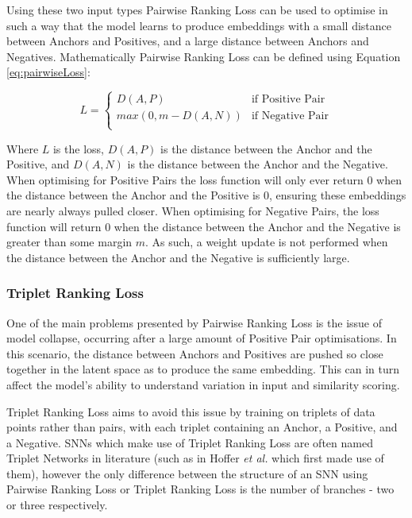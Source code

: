 Using these two input types Pairwise Ranking Loss can be used to optimise in such a way that the model learns to produce embeddings with a small distance between Anchors and Positives, and a large distance between Anchors and Negatives. Mathematically Pairwise Ranking Loss can be defined using Equation \ref{eq:pairwiseLoss}:

\begin{equation}
	\label{eq:pairwiseLoss}
	L =
		\begin{cases}
			D(A,P) & \text{if Positive Pair}\\
			max(0, m - D(A,N)) & \text{if Negative Pair}\\
		\end{cases}       
\end{equation}

Where $L$ is the loss, $D(A,P)$ is the distance between the Anchor and the Positive, and $D(A,N)$ is the distance between the Anchor and the Negative. When optimising for Positive Pairs the loss function will only ever return 0 when the distance between the Anchor and the Positive is 0, ensuring these embeddings are nearly always pulled closer. When optimising for Negative Pairs, the loss function will return 0 when the distance between the Anchor and the Negative is greater than some margin $m$. As such, a weight update is not performed when the distance between the Anchor and the Negative is sufficiently large.

\subsubsection{Triplet Ranking Loss}\label{ch:ID,sec:SNNBackground,sub:lossFunction,subsub:Triplet}

One of the main problems presented by Pairwise Ranking Loss is the issue of model collapse, occurring after a large amount of Positive Pair optimisations. In this scenario, the distance between Anchors and Positives are pushed so close together in the latent space as to produce the same embedding. This can in turn affect the model's ability to understand variation in input and similarity scoring. 

Triplet Ranking Loss aims to avoid this issue by training on triplets of data points rather than pairs, with each triplet containing an Anchor, a Positive, and a Negative. SNNs which make use of Triplet Ranking Loss are often named Triplet Networks in literature (such as in Hoffer \textit{et al.} \cite{hoffer_deep_2018} which first made use of them), however the only difference between the structure of an SNN using Pairwise Ranking Loss or Triplet Ranking Loss is the number of branches - two or three respectively. 

